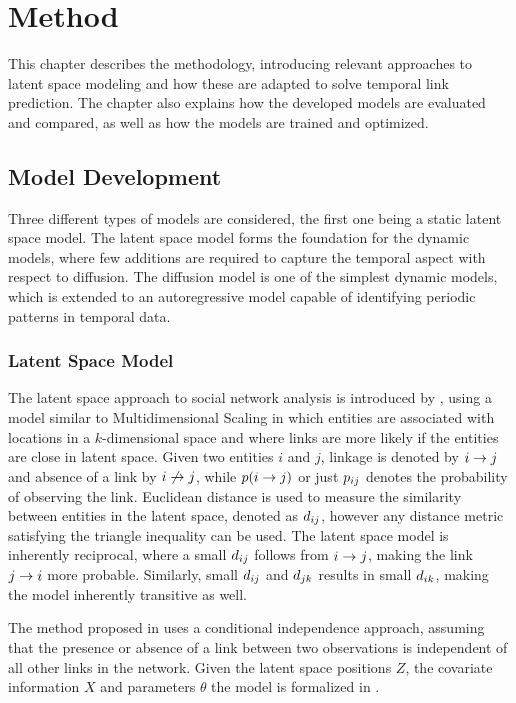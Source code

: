 
\chapter{Method}\label{ch:Method}

This chapter describes the methodology, introducing relevant approaches to latent space modeling and how these are adapted to solve temporal link prediction. The chapter also explains how the developed models are evaluated and compared, as well as how the models are trained and optimized.

\section{Model Development}

    Three different types of models are considered, the first one being a static latent space model. The latent space model forms the foundation for the dynamic models, where few additions are required to capture the temporal aspect with respect to diffusion. The diffusion model is one of the simplest dynamic models, which is extended to an autoregressive model capable of identifying periodic patterns in temporal data.

    \subsection{Latent Space Model}
    
        The latent space approach to social network analysis is introduced by \citeauthor{hoff2002latent} \cite{hoff2002latent}, using a model similar to Multidimensional Scaling in which entities are associated with locations in a $k$-dimensional space and where links are more likely if the entities are close in latent space.
        Given two entities $i$ and $j$, linkage is denoted by $\link$ and absence of a link by $\link*$, while $p(\link)$ or just $\sub(p)$ denotes the probability of observing the link. 
        Euclidean distance is used to measure the similarity between entities in the latent space, denoted as $\sub(d)$, however any distance metric satisfying the triangle inequality can be used.
        The latent space model is inherently reciprocal, where a small $\sub(d)$ follows from $\link$, making the link $\link(j)(i)$ more probable. Similarly, small $\sub(d)$ and $\sub(d)(jk)$ results in small $\sub(d)(ik)$, making the model inherently transitive as well.
        
        The method proposed in \cite{hoff2002latent} uses a conditional independence approach, assuming that the presence or absence of a link between two observations is independent of all other links in the network. Given the latent space positions $Z$, the covariate information $X$ and parameters $\theta$ the model is formalized in . 
        
